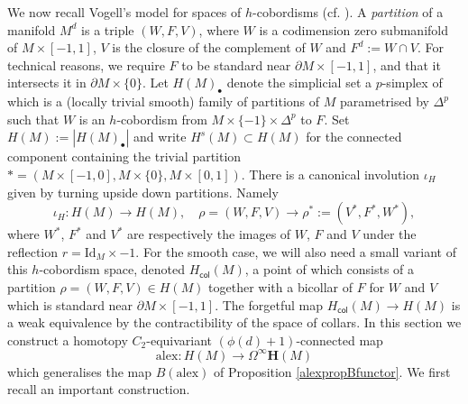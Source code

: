 \documentclass[a4paper, oneside]{amsart}
\newcommand{\1}{\mathds{1}}
\theoremstyle{remark}
\theoremstyle{definition}
\newcommand{\Hsp}{\mathbf{H}}
\numberwithin{equation}{section}
\begin{document}
We now recall Vogell's model for spaces of $h$-cobordisms (cf. \cite[p. 296]{VogellInvolution}). A \textit{partition} of a manifold $M^d$ is a triple $(W,F,V)$, where $W$ is a codimension zero submanifold of $M\times[-1,1]$, $V$ is the closure of the complement of $W$ and $F^d:=W\cap V$. For technical reasons, we require $F$ to be standard near $\partial M\times [-1,1]$, and that it intersects it in $\partial M\times\{0\}$. Let $H(M)_\bullet$ denote the simplicial set a $p$-simplex of which is a (locally trivial smooth) family of partitions of $M$ parametrised by $\Delta^p$ such that $W$ is an $h$-cobordism from $M\times \{-1\}\times \Delta^p$ to $F$. Set $H(M):=|H(M)_\bullet|$ and write $H^s(M)\subset H(M)$ for the connected component containing the trivial partition $*=(M\times [-1,0], M\times \{0\}, M\times[0,1])$. There is a canonical involution $\iota_H$ given by turning upside down partitions. Namely
$$
\iota_H: H(M)\longrightarrow H(M), \quad \rho=(W,F,V)\longrightarrow \rho^*:=(V^*,F^*,W^*),
$$
where $W^*$, $F^*$ and $V^*$ are respectively the images of $W$, $F$ and $V$ under the reflection $r=\mathrm{Id}_M\times -1$. For the smooth case, we will also need a small variant of this $h$-cobordism space, denoted $H_{\mathsf{col}}(M)$, a point of which consists of a partition $\rho=(W,F,V)\in H(M)$ together with a bicollar of $F$ for $W$ and $V$ which is standard near $\partial M\times[-1,1]$. The forgetful map $H_{\mathsf{col}}(M)\to H(M)$ is a weak equivalence by the contractibility of the space of collars. In this section we construct a homotopy $C_2$-equivariant $(\phi(d)+1)$-connected map
\begin{equation}\label{totalalexhcobmap}
    \mathrm{alex}: H(M)\longrightarrow \Omega^\infty \Hsp(M)
\end{equation}
which generalises the map $B(\mathrm{alex})$ of Proposition \ref{alexpropBfunctor}. We first recall an important construction.
\end{document}
